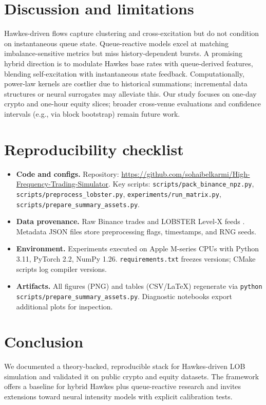 \documentclass[11pt]{article}
\newcommand{\1}{\mathbbm{1}}
\begin{document}
\section{Discussion and limitations}\label{sec:discussion}
Hawkes-driven flows capture clustering and cross-excitation but do not condition on instantaneous queue state. Queue-reactive models excel at matching imbalance-sensitive metrics but miss history-dependent bursts. A promising hybrid direction is to modulate Hawkes base rates with queue-derived features, blending self-excitation with instantaneous state feedback. Computationally, power-law kernels are costlier due to historical summations; incremental data structures or neural surrogates \cite{MeiEisner2017,Zuo2020} may alleviate this. Our study focuses on one-day crypto and one-hour equity slices; broader cross-venue evaluations and confidence intervals (e.g., via block bootstrap) remain future work.

\section{Reproducibility checklist}\label{sec:repro}
\begin{itemize}[leftmargin=*, itemsep=2pt]
  \item \textbf{Code and configs.} Repository: \url{https://github.com/sohaibelkarmi/High-Frequency-Trading-Simulator}. Key scripts: \texttt{scripts/pack\_binance\_npz.py}, \texttt{scripts/preprocess\_lobster.py}, \texttt{experiments/run\_matrix.py}, \texttt{scripts/prepare\_summary\_assets.py}.
  \item \textbf{Data provenance.} Raw Binance trades \cite{BinanceData} and LOBSTER Level-X feeds \cite{LOBSTER}. Metadata JSON files store preprocessing flags, timestamps, and RNG seeds.
  \item \textbf{Environment.} Experiments executed on Apple M-series CPUs with Python 3.11, PyTorch 2.2, NumPy 1.26. \texttt{requirements.txt} freezes versions; CMake scripts log compiler versions.
  \item \textbf{Artifacts.} All figures (PNG) and tables (CSV/LaTeX) regenerate via \texttt{python scripts/prepare\_summary\_assets.py}. Diagnostic notebooks export additional plots for inspection.
\end{itemize}

\section{Conclusion}
We documented a theory-backed, reproducible stack for Hawkes-driven LOB simulation and validated it on public crypto and equity datasets. The framework offers a baseline for hybrid Hawkes plus queue-reactive research and invites extensions toward neural intensity models with explicit calibration tests.
\end{document}
